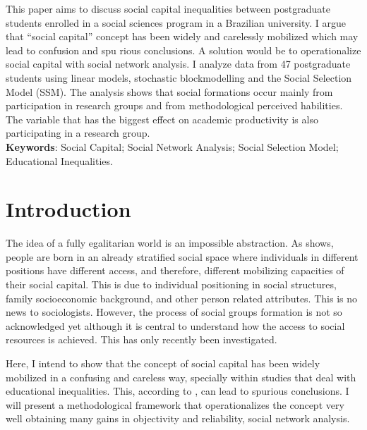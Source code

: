 \documentclass[a4paper, 12pt, openright, oneside, article, german, french, brazil, english]{abntex2}
\begin{document}
\maketitle

	\begin{resumo}
		This paper aims to discuss social capital inequalities between postgraduate students enrolled in a social sciences program in a Brazilian university. I argue that ``social capital'' concept has been widely and carelessly mobilized which may lead to confusion and spu
		rious conclusions. A solution would be to operationalize social capital with social network analysis. I analyze data from 47 postgraduate students using linear models, stochastic blockmodelling and the Social Selection Model (SSM). The analysis shows that social formations occur mainly from participation in research groups and from methodological perceived habilities. The variable that has the biggest effect on academic productivity is also participating in a research group.
		\\
		\textbf{Keywords}: Social Capital; Social Network Analysis; Social Selection Model; Educational Inequalities.
	\end{resumo}
	
\textual

\section{Introduction}

The idea of a fully egalitarian world is an impossible abstraction. As  shows, people are born in an already stratified social space where individuals in different positions have different access, and therefore, different mobilizing capacities of their social capital. This is due to individual positioning in social structures, family socioeconomic background, and other person related attributes. This is no news to sociologists. However, the process of social groups formation is not so acknowledged yet although it is central to understand how the access to social resources is achieved. This has only recently been investigated.

Here, I intend to show that the concept of social capital has been widely mobilized in a confusing and careless way, specially within studies that deal with educational inequalities. This, according to , can lead to spurious conclusions. I will present a methodological framework that operationalizes the concept very well obtaining many gains in objectivity and reliability, social network analysis.
\end{document}
